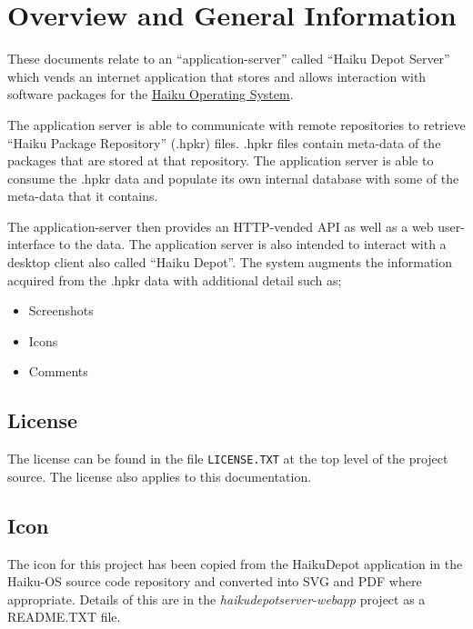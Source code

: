 
\section{Overview and General Information}

These documents relate to an ``application-server'' called ``Haiku Depot Server'' which vends an internet application that stores and allows interaction with software packages for the \href{http://www.haiku-os.org}{Haiku Operating System}.

The application server is able to communicate with remote repositories to retrieve ``Haiku Package Repository'' (.hpkr) files.  .hpkr files contain meta-data of the packages that are stored at that repository.  The application server is able to consume the .hpkr data and populate its own internal database with some of the meta-data that it contains.

The application-server then provides an HTTP-vended API as well as a web user-interface to the data.  The application server is also intended to interact with a desktop client also called ``Haiku Depot''.  The system augments the information acquired from the .hpkr data with additional detail such as;

\begin{itemize}
\item Screenshots
\item Icons
\item Comments
\end{itemize}

\subsection{License}

The license can be found in the file {\tt LICENSE.TXT} at the top level of the project source.  The license also applies to this documentation.

\subsection{Icon}

The icon for this project has been copied from the HaikuDepot application in the Haiku-OS source code repository and converted into SVG and PDF where appropriate.  Details of this are in the {\it haikudepotserver-webapp} project as a README.TXT file.

